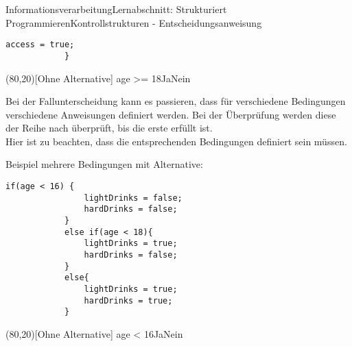 \documentclass[11pt,oneside,openany,headings=optiontotoc,11pt,numbers=noenddot]{article}
\begin{document}
\begin{worksheet}{Informationsverarbeitung}{Lernabschnitt: Strukturiert Programmieren}{Kontrollstrukturen - Entscheidungsanweisung}
\begin{minipage}[t]{0.48\textwidth}
\begin{lstlisting}[style=JavaInputStyle,frame=single]
				access = true;
			}
			\end{lstlisting}
		\end{minipage}
		\hfill
		\begin{minipage}[t]{0.48\textwidth}
			\vspace*{0pt}
			\begin{struktogramm}(80,20)[Ohne Alternative]
				{age >= 18}{Ja}{Nein}
				\change
				\ifend
			\end{struktogramm}
		\end{minipage}
		\par\noindent
		Bei der Fallunterscheidung kann es passieren, dass für verschiedene Bedingungen verschiedene Anweisungen definiert werden. Bei der Überprüfung werden diese der Reihe nach überprüft, bis die erste erfüllt ist.\\
		Hier ist zu beachten, dass die entsprechenden Bedingungen definiert sein müssen.
		\par\noindent
		\begin{minipage}[t]{0.48\textwidth}
			\vspace*{0pt}
			Beispiel mehrere Bedingungen mit Alternative:
			\begin{lstlisting}[style=JavaInputStyle,frame=single]
			if(age < 16) {
				lightDrinks = false;
				hardDrinks = false;
			}
			else if(age < 18){
				lightDrinks = true;
				hardDrinks = false;
			}
			else{
				lightDrinks = true;
				hardDrinks = true;
			}
			\end{lstlisting}
		\end{minipage}
		\hfill
		\begin{minipage}[t]{0.48\textwidth}
			\vspace*{0pt}
			\begin{struktogramm}(80,20)[Ohne Alternative]
				{age < 16}{Ja}{Nein}
				\change
				\change
				\ifend
				\ifend
			\end{struktogramm}
		\end{minipage}

\end{worksheet}
\end{document}
